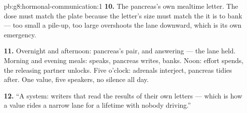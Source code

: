 \begin{solution}{pb:g8:hormonal-communication:1}
\textbf{10.} The pancreas's own mealtime letter. The
dose must match the plate because the letter's size must
match the  it is to bank --- too small  a
pile-up, too large overshoots the lane downward, which
is its own emergency.

\textbf{11.} Overnight and afternoon: pancreas's pair,
 and  answering --- the lane held. Morning
and evening meals:  speaks, pancreas writes,
 banks. Noon: effort spends, the releasing partner
unlocks. Five o'clock: adrenals interject, pancreas
tidies after. One value, five speakers, no silence all
day.

\textbf{12.} ``A  system: writers that read the
results of their own letters --- which is how a value
rides a narrow lane for a lifetime with nobody
driving.''
\end{solution}
